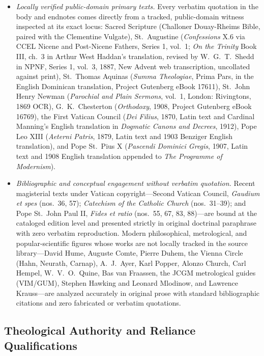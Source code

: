\begin{itemize}
\item \emph{Locally verified public-domain primary texts.} Every verbatim quotation in the body and endnotes comes directly from a tracked, public-domain witness inspected at its exact locus: Sacred Scripture (Challoner Douay-Rheims Bible, paired with the Clementine Vulgate), St.\ Augustine (\emph{Confessions} X.6 via CCEL Nicene and Post-Nicene Fathers, Series 1, vol.\ 1; \emph{On the Trinity} Book III, ch.\ 3 in Arthur West Haddan's translation, revised by W.\ G.\ T.\ Shedd in NPNF, Series 1, vol.\ 3, 1887, New Advent web transcription, uncollated against print), St.\ Thomas Aquinas (\emph{Summa Theologiae}, Prima Pars, in the English Dominican translation, Project Gutenberg eBook 17611), St.\ John Henry Newman (\emph{Parochial and Plain Sermons}, vol.\ 1, London: Rivingtons, 1869 OCR), G.\ K.\ Chesterton (\emph{Orthodoxy}, 1908, Project Gutenberg eBook 16769), the First Vatican Council (\emph{Dei Filius}, 1870, Latin text and Cardinal Manning's English translation in \emph{Dogmatic Canons and Decrees}, 1912), Pope Leo XIII (\emph{Aeterni Patris}, 1879, Latin text and 1903 Benziger English translation), and Pope St.\ Pius X (\emph{Pascendi Dominici Gregis}, 1907, Latin text and 1908 English translation appended to \emph{The Programme of Modernism}).
\item \emph{Bibliographic and conceptual engagement without verbatim quotation.} Recent magisterial texts under Vatican copyright---Second Vatican Council, \emph{Gaudium et spes} (nos.\ 36, 57); \emph{Catechism of the Catholic Church} (nos.\ 31--39); and Pope St.\ John Paul II, \emph{Fides et ratio} (nos.\ 55, 67, 83, 88)---are bound at the cataloged edition level and presented strictly in original doctrinal paraphrase with zero verbatim reproduction. Modern philosophical, metrological, and popular-scientific figures whose works are not locally tracked in the source library---David Hume, Auguste Comte, Pierre Duhem, the Vienna Circle (Hahn, Neurath, Carnap), A.\ J.\ Ayer, Karl Popper, Alonzo Church, Carl Hempel, W.\ V.\ O.\ Quine, Bas van Fraassen, the JCGM metrological guides (VIM/GUM), Stephen Hawking and Leonard Mlodinow, and Lawrence Krauss---are analyzed accurately in original prose with standard bibliographic citations and zero fabricated or verbatim quotations.
\end{itemize}

\subsection*{Theological Authority and Reliance Qualifications}

